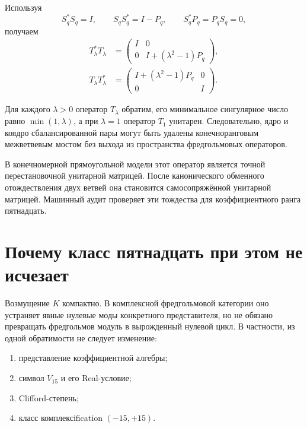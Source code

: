 Используя
\begin{equation}
 S_q^*S_q=I,
 \qquad
 S_qS_q^*=I-P_q,
 \qquad
 S_q^*P_q=P_qS_q=0,
\end{equation}
получаем
\begin{align}
 T_\lambda^*T_\lambda
 &=
 \begin{pmatrix}
 I&0\\0&I+(\lambda^2-1)P_q
 \end{pmatrix},\\
 T_\lambda T_\lambda^*
 &=
 \begin{pmatrix}
 I+(\lambda^2-1)P_q&0\\0&I
 \end{pmatrix}.
 \label{eq:v6-exchange-bridge-products}
\end{align}

\begin{theorem}
Для каждого $\lambda>0$ оператор $T_\lambda$ обратим, его минимальное
сингулярное число равно $\min(1,\lambda)$, а при $\lambda=1$ оператор
$T_1$ унитарен. Следовательно, ядро и коядро сбалансированной пары могут
быть удалены конечноранговым межветвевым мостом без выхода из пространства
фредгольмовых операторов.
\end{theorem}

В конечномерной прямоугольной модели этот оператор является точной
перестановочной унитарной матрицей. После канонического обменного
отождествления двух ветвей она становится самосопряжённой унитарной
матрицей. Машинный аудит проверяет эти тождества для коэффициентного ранга
пятнадцать.

\section{Почему класс пятнадцать при этом не исчезает}

Возмущение $K$ компактно. В комплексной фредгольмовой категории оно
устраняет явные нулевые моды конкретного представителя, но не обязано
превращать фредгольмов модуль в вырожденный нулевой цикл. В частности,
из одной обратимости не следует изменение:
\begin{enumerate}
 \item представление коэффициентной алгебры;
 \item символ $V_{15}$ и его Real-условие;
 \item Clifford-степень;
 \item класс комплексification $(-15,+15)$.
\end{enumerate}

